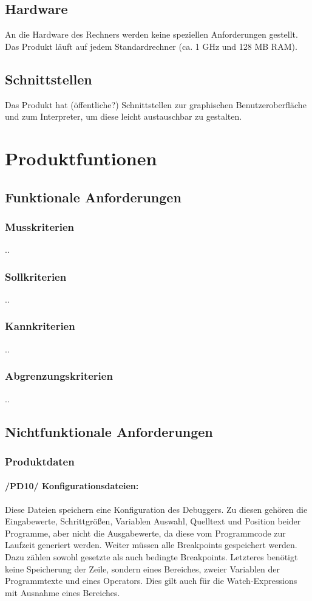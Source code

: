 \documentclass[parskip=full]{scrartcl}
\begin{document}
\subsection{Hardware}
An die Hardware des Rechners werden keine speziellen Anforderungen gestellt. Das Produkt läuft auf jedem Standardrechner (ca. 1 GHz und 128 MB RAM).

\subsection{Schnittstellen}
Das Produkt hat (öffentliche?) Schnittstellen zur graphischen Benutzeroberfläche und zum Interpreter, um diese leicht austauschbar zu gestalten.


\section{Produktfuntionen}
	\subsection{Funktionale Anforderungen}
		\subsubsection{Musskriterien}
		..
		\subsubsection{Sollkriterien}
		..
		\subsubsection{Kannkriterien}
		..
		\subsubsection{Abgrenzungskriterien}
		..
	\subsection{Nichtfunktionale Anforderungen}
		\subsubsection{Produktdaten}
			\paragraph{/PD10/ Konfigurationsdateien:}
			Diese Dateien speichern eine Konfiguration des Debuggers.
			Zu diesen gehören die Eingabewerte, Schrittgrößen, Variablen Auswahl, 						Quelltext und Position beider Programme, aber nicht die Ausgabewerte, da diese 			vom Programmcode zur Laufzeit generiert werden.
			Weiter müssen alle Breakpoints gespeichert werden. Dazu zählen sowohl gesetzte 			als auch bedingte Breakpoints. Letzteres benötigt keine Speicherung der Zeile, 			sondern eines Bereiches, zweier Variablen der Programmtexte und eines Operators. 				Dies gilt auch für die Watch-Expressions mit Ausnahme eines Bereiches.
\end{document}
